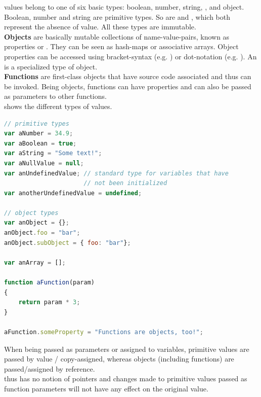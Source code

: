 \newpage
{} values belong to one of six basic types: boolean, number, string, ,  and object.\\
Boolean, number and string are primitive types. So are  and , which both represent the absence of value. All these types are immutable.\\
\textbf{Objects} are basically mutable collections of name-value-pairs, known as properties or . They can be seen as hash-maps or associative arrays. Object properties can be accessed using bracket-syntax (e.g. ) or dot-notation (e.g. ). An  is a specialized type of  object.\\
\textbf{Functions} are first-class objects that have source code associated and thus can be invoked. Being objects, functions can have properties and can also be passed as \linebreak parameters to other functions.\\
 shows the different types of  values.

\SingleSpacing
\begin{lstlisting}[language=JavaScript, caption=Types in \myProperName{JavaScript}, label=JSTypes]
// primitive types
var aNumber = 34.9;
var aBoolean = true;
var aString = "Some text!";
var aNullValue = null;
var anUndefinedValue; // standard type for variables that have 
                      // not been initialized
var anotherUndefinedValue = undefined;

// object types
var anObject = {};
anObject.foo = "bar";
anObject.subObject = { foo: "bar"};

var anArray = [];

function aFunction(param)
{
	return param * 3;
}

aFunction.someProperty = "Functions are objects, too!";
\end{lstlisting}
\OnehalfSpacing

When being passed as parameters or assigned to variables, primitive values are passed by value / copy-assigned, whereas objects (including functions) are passed/assigned by reference.\\
 thus has no notion of pointers and changes made to primitive values passed as function parameters will not have any effect on the original value.

